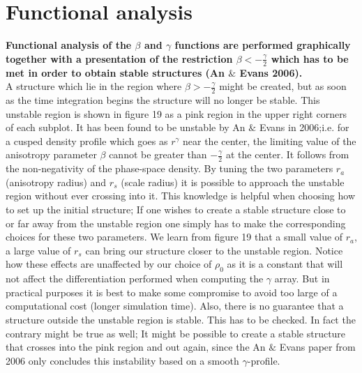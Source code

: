 \section{Functional analysis}
\textbf{Functional analysis of the $\beta$ and $\gamma$ functions are performed graphically together with a presentation of the restriction $\beta < -\frac{\gamma}{2}$ which has to be met in order to obtain stable structures (An $\&$ Evans 2006).} \\ 

A structure which lie in the region where $\beta > -\frac{\gamma}{2}$ might be created, but as soon as the time integration begins the structure will no longer be stable. This unstable region is shown in figure 19 as a pink region in the upper right corners of each subplot. It has been found to be unstable by An $\&$ Evans in 2006;i.e. for a cusped density profile which goes as $r^{\gamma}$ near the center, the limiting value of the anisotropy parameter $\beta$ cannot be greater than $-\frac{\gamma}{2}$ at the center. It follows from the non-negativity of the phase-space density. By tuning the two parameters $r_a$ (anisotropy radius) and $r_s$ (scale radius) it is possible to approach the unstable region without ever crossing into it. This knowledge is helpful when choosing how to set up the initial structure; If one wishes to create a stable structure close to or far away from the unstable region one simply has to make the corresponding choices for these two parameters. We learn from figure 19 that a small value of $r_a$, a large value of $r_s$ can bring our structure closer to the unstable region. Notice how these effects are unaffected by our choice of $\rho_0$ as it is a constant that will not affect the differentiation performed when computing the $\gamma$ array. But in practical purposes it is best to make some compromise to avoid too large of a computational cost (longer simulation time). Also, there is no guarantee that a structure outside the unstable region is stable. This has to be checked. In fact the contrary might be true as well; It might be possible to create a stable structure that crosses into the pink region and out again, since the An $\&$ Evans paper from 2006 only concludes this instability based on a smooth $\gamma$-profile. 
